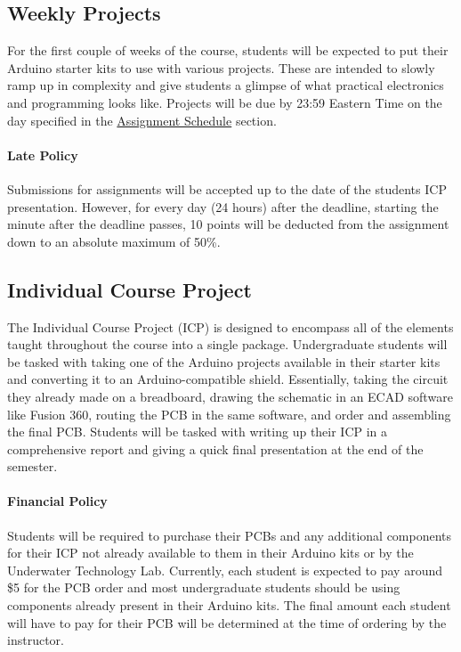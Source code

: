     \subsection*{Weekly Projects}
    For the first couple of weeks of the course, students will be expected to put their Arduino starter kits to use with various projects.
    These are intended to slowly ramp up in complexity and give students a glimpse of what practical electronics and programming looks like.
    Projects will be due by 23:59 Eastern Time on the day specified in the \hyperref[sec:assignment_sch]{Assignment Schedule} section.
    
    \paragraph*{Late Policy} Submissions for assignments will be accepted up to the date of the students ICP presentation.
    However, for every day (24 hours) after the deadline, starting the minute after the deadline passes, 10 points will be deducted from the assignment down to an absolute maximum of 50\%.


    \subsection*{Individual Course Project}
    The Individual Course Project (ICP) is designed to encompass all of the elements taught throughout the course into a single package.
    Undergraduate students will be tasked with taking one of the Arduino projects available in their starter kits and converting it to an Arduino-compatible shield.
    Essentially, taking the circuit they already made on a breadboard, drawing the schematic in an ECAD software like Fusion 360, routing the PCB in the same software, and order and assembling the final PCB. 
    Students will be tasked with writing up their ICP in a comprehensive report and giving a quick final presentation at the end of the semester.

    \paragraph*{Financial Policy} Students will be required to purchase their PCBs and any additional components for their ICP not already available to them in their Arduino kits or by the Underwater Technology Lab. 
    Currently, each student is expected to pay around \$5 for the PCB order and most undergraduate students should be using components already present in their Arduino kits. 
    The final amount each student will have to pay for their PCB will be determined at the time of ordering by the instructor.
    
